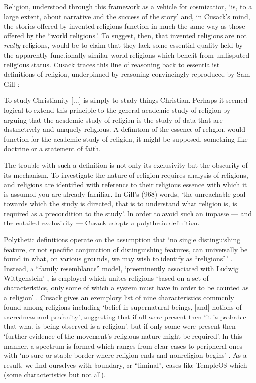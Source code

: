\documentclass{article}
\begin{document}
Religion, understood through this framework as a vehicle for cosmization,
`is, to a large extent, about narrative and the success of the story'
and, in Cusack's \parencite*[4]{Cusack10} mind,
the stories offered by invented religions function in much the same way
as those offered by the ``world religions''.
To suggest, then, that invented religions are not \textit{really} religions,
would be to claim that they lack some essential quality held by
the apparently functionally similar world religions
which benefit from undisputed religious status.
Cusack traces this line of reasoning back to essentialist definitions
of religion, underpinned by reasoning convincingly
reproduced by Sam Gill \parencite*[968]{Gill94}:
\begin{displayquote}
  To study Christianity [...] is simply to study things Christian.
  Perhaps it seemed logical to extend this principle to the general
  academic study of religion by arguing that the academic study of religion
  is the study of data that are distinctively and uniquely religious.
  A definition of the essence of religion would function for the academic
  study of religion, it might be supposed, something like doctrine or a
  statement of faith.
\end{displayquote}
The trouble with such a definition is not only its exclusivity but the
obscurity of its mechanism.
To investigate the nature of religion requires analysis of religions,
and religions are identified with reference to their religious essence
with which it is assumed you are already familiar.
In Gill's (968) words, `the unreachable goal towards which the study
is directed, that is to understand what religion is,
is required as a precondition to the study'.
In order to avoid such an impasse --- and the entailed exclusivity ---
Cusack adopts a polythetic definition.

Polythetic definitions operate on the assumption that
`no single distinguishing feature, or not specfific conjunction
of distinguishing features, can universally be found in what,
on various grounds, we may wish to identify as ``religions''\thinspace'
\parencite[158]{Saler93}.
Instead, a ``family resemblance'' model, `preeminently associated with
Ludwig Wittgenstein' \parencite[159]{Saler93}, is employed which unites
religions `based on a set of characteristics, only some of which a system
must have in order to be counted as a religion' \parencite[158]{Wilson98}.
Cusack \parencite*[20]{Cusack10} gives an exemplory list
of nine characteristics commonly found among religions including
`belief in supernatural beings, [and] notions of sacredness and profanity',
suggesting that if all were present then `it is probable that what is being
observed is a religion', but if only some were present then `further
evidence of the movement's religious nature might be required'.
In this manner, a spectrum is formed which ranges from clear cases to
peripheral ones with `no sure or stable border where religion ends and
nonreligion begins' \parencite[396]{Saler99}.
As a result, we find ourselves with boundary, or ``liminal'', cases like
TempleOS which (some characteristics but not all).





\clearpage
\printbibliography
\end{document}

